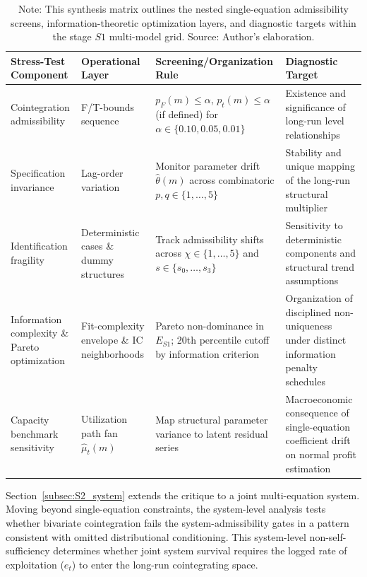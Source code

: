 \documentclass[11pt]{article}
\begin{document}
\begin{table}[H]
\centering
\small
\caption{Synthesis of Admissibility Specification Stress Tests}
\label{tab:s1_stress_synthesis}
\begin{tabular}{@{}>{\raggedright\arraybackslash}p{3.2cm}>{\raggedright\arraybackslash}p{2.6cm}>{\raggedright\arraybackslash}p{3.8cm}>{\raggedright\arraybackslash}p{4.0cm}@{}}
\toprule
Stress-Test Component & Operational Layer & Screening/Organization Rule & Diagnostic Target \\
\midrule
\midrule
Cointegration admissibility & F/T-bounds sequence & $p_F(m) \leq \alpha$, $p_t(m) \leq \alpha$ (if defined) for $\alpha \in \{0.10, 0.05, 0.01\}$ & Existence and significance of long-run level relationships \\
Specification invariance & Lag-order variation & Monitor parameter drift $\hat{\theta}(m)$ across combinatoric $p,q \in \{1,\dots,5\}$ & Stability and unique mapping of the long-run structural multiplier \\
Identification fragility & Deterministic cases \& dummy structures & Track admissibility shifts across $\chi \in \{1,\dots,5\}$ and $s \in \{s_0,\dots,s_3\}$ & Sensitivity to deterministic components and structural trend assumptions \\
Information complexity \& Pareto optimization & Fit-complexity envelope \& IC neighborhoods & Pareto non-dominance in $E_{S1}$; 20th percentile cutoff by information criterion & Organization of disciplined non-uniqueness under distinct information penalty schedules \\
Capacity benchmark sensitivity & Utilization path fan $\hat{\mu}_t(m)$ & Map structural parameter variance to latent residual series & Macroeconomic consequence of single-equation coefficient drift on normal profit estimation \\
\bottomrule
\end{tabular}
\caption*{Note: This synthesis matrix outlines the nested single-equation admissibility screens, information-theoretic optimization layers, and diagnostic targets within the stage $S1$ multi-model grid. Source: Author's elaboration.}
\end{table}

Section~\ref{subsec:S2_system} extends the critique to a joint multi-equation system. Moving beyond single-equation constraints, the system-level analysis tests whether bivariate cointegration fails the system-admissibility gates in a pattern consistent with omitted distributional conditioning. This system-level non-self-sufficiency determines whether joint system survival requires the logged rate of exploitation ($e_t$) to enter the long-run cointegrating space.
\end{document}

